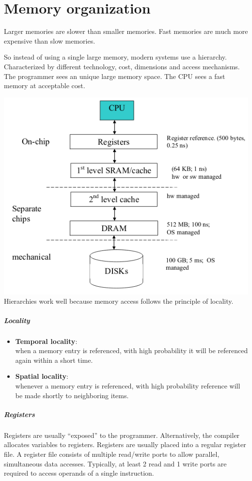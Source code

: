 \chapter{Memory organization}

Larger memories are slower than smaller memories.
Fast memories are much more expensive than slow memories.

So instead of using a single large memory, modern systems use a hierarchy. 
Characterized by different technology, cost, dimensions and access mechanisms. The programmer sees an unique large memory space. The CPU sees a fast memory at acceptable cost.

\includegraphics[width=.7\textwidth]{images/memory_hierarchy.png}
Hierarchies work well because memory access follows the principle of locality.

\paragraph{Locality}
\begin{itemize}
    \item \textbf{Temporal locality}:\\
    when a memory entry is referenced, with high probability it will be referenced again within a short time.
    
    \item \textbf{Spatial locality}:\\
    whenever a memory entry is referenced, with high probability reference will be made shortly to neighboring items.
\end{itemize}

\paragraph{Registers}
Registers are usually “exposed” to the programmer. Alternatively, the compiler allocates variables to registers.
Registers are usually placed into a regular register file. A register file consists of multiple read/write ports to allow parallel, simultaneous data accesses.
Typically, at least 2 read and 1 write ports are required to access operands of a single instruction.


